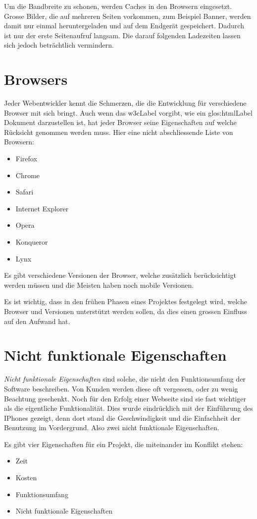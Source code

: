 Um die Bandbreite zu schonen, werden Caches in den Browsern eingesetzt. Grosse Bilder, die auf mehreren Seiten vorkommen, zum Beispiel Banner, werden damit nur einmal heruntergeladen und auf dem Endgerät gespeichert. Dadurch ist nur der erste Seitenaufruf langsam. Die darauf folgenden Ladezeiten lassen sich jedoch beträchtlich vermindern.

\section{Browsers}
Jeder Webentwickler kennt die Schmerzen, die die Entwicklung für verschiedene Browser mit sich bringt. Auch wenn das \gls{w3cLabel} vorgibt, wie ein \Gls{glos:htmlLabel} Dokument darzustellen ist, hat jeder Browser seine Eigenschaften auf welche Rücksicht genommen werden muss. Hier eine nicht abschliessende Liste von Browsern:
\begin{itemize}
\item Firefox
\item Chrome
\item Safari
\item Internet Explorer
\item Opera
\item Konqueror
\item Lynx
\end{itemize}
Es gibt verschiedene Versionen der Browser, welche zusätzlich berücksichtigt werden müssen und die Meisten haben noch mobile Versionen.

Es ist wichtig, dass in den frühen Phasen eines Projektes festgelegt wird, welche Browser und Versionen unterstützt werden sollen, da dies einen grossen Einfluss auf den Aufwand hat.

\section{Nicht funktionale Eigenschaften}
\textit{Nicht funktionale Eigenschaften} sind solche, die nicht den Funktionsumfang der Software beschreiben. Von Kunden werden diese oft vergessen, oder zu wenig Beachtung geschenkt. Noch für den Erfolg einer Webseite sind sie fast wichtiger als die eigentliche Funktionalität. Dies wurde eindrücklich mit der Einführung des IPhones gezeigt, denn dort stand die Geschwindigkeit und die Einfachheit der Benutzung im Vordergrund. Also zwei nicht funktionale Eigenschaften. 

Es gibt vier Eigenschaften für ein Projekt, die miteinander im Konflikt stehen:
\begin{itemize}
\item Zeit
\item Kosten
\item Funktionsumfang
\item Nicht funktionale Eigenschaften
\end{itemize}

